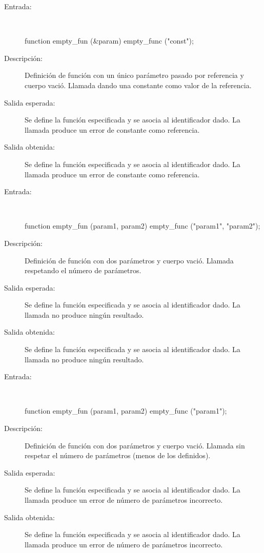 	\begin{description}
		\item [Entrada:] \hfill \\
\begin{myverbatim}
   function empty_fun (&param) { } 
   empty_func ("const");
\end{myverbatim}
		\item [Descripción:] Definición de función con un único parámetro pasado por referencia y cuerpo vació. Llamada dando una constante como valor de la referencia.
		\item [Salida esperada:] Se define la función especificada y se asocia al identificador dado. La llamada produce un error de constante como referencia.
		\item [Salida obtenida:] Se define la función especificada y se asocia al identificador dado. La llamada produce un error de constante como referencia.
	\end{description}

	\begin{description}
		\item [Entrada:] \hfill \\
\begin{myverbatim}
   function empty_fun (param1, param2) { } 
   empty_func ("param1", "param2");
\end{myverbatim}
		\item [Descripción:] Definición de función con dos parámetros y cuerpo vació. Llamada respetando el número de parámetros.
		\item [Salida esperada:] Se define la función especificada y se asocia al identificador dado. La llamada no produce ningún resultado.
		\item [Salida obtenida:] Se define la función especificada y se asocia al identificador dado. La llamada no produce ningún resultado.
	\end{description}

	\begin{description}
		\item [Entrada:] \hfill \\
\begin{myverbatim}
   function empty_fun (param1, param2) { } 
   empty_func ("param1");
\end{myverbatim}
		\item [Descripción:] Definición de función con dos parámetros y cuerpo vació. Llamada sin respetar el número de parámetros (menos de los definidos). 
		\item [Salida esperada:] Se define la función especificada y se asocia al identificador dado. La llamada produce un error de número de parámetros incorrecto. 
		\item [Salida obtenida:] Se define la función especificada y se asocia al identificador dado. La llamada produce un error de número de parámetros incorrecto.
	\end{description}

